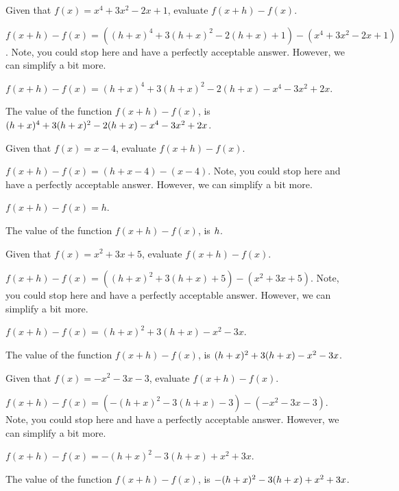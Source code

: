 \begin{shuffle}
\begin{exercise}
Given that $f(x)=x^4+3 x^2-2 x+1$, evaluate $f(x+h)-f(x)$.
\begin{solution}
\begin{hint}
$f(x+h)-f(x)=((h+x)^4+3 (h+x)^2-2 (h+x)+1)-(x^4+3 x^2-2 x+1)$. Note, you could stop here and have a perfectly acceptable answer. However, we can simplify a bit more.
\end{hint}
\begin{hint}
$f(x+h)-f(x)=(h+x)^4+3 (h+x)^2-2 (h+x)-x^4-3 x^2+2 x$.
\end{hint}
The value of the function $f(x+h)-f(x)$, is ${(h+x)^4+3 (h+x)^2-2 (h+x)-x^4-3 x^2+2 x}$.
\end{solution}
\end{exercise}

\begin{exercise}
Given that $f(x)=x-4$, evaluate $f(x+h)-f(x)$.
\begin{solution}
\begin{hint}
$f(x+h)-f(x)=(h+x-4)-(x-4)$. Note, you could stop here and have a perfectly acceptable answer. However, we can simplify a bit more.
\end{hint}
\begin{hint}
$f(x+h)-f(x)=h$.
\end{hint}
The value of the function $f(x+h)-f(x)$, is ${h}$.
\end{solution}
\end{exercise}

\begin{exercise}
Given that $f(x)=x^2+3 x+5$, evaluate $f(x+h)-f(x)$.
\begin{solution}
\begin{hint}
$f(x+h)-f(x)=((h+x)^2+3 (h+x)+5)-(x^2+3 x+5)$. Note, you could stop here and have a perfectly acceptable answer. However, we can simplify a bit more.
\end{hint}
\begin{hint}
$f(x+h)-f(x)=(h+x)^2+3 (h+x)-x^2-3 x$.
\end{hint}
The value of the function $f(x+h)-f(x)$, is ${(h+x)^2+3 (h+x)-x^2-3 x}$.
\end{solution}
\end{exercise}

\begin{exercise}
Given that $f(x)=-x^2-3 x-3$, evaluate $f(x+h)-f(x)$.
\begin{solution}
\begin{hint}
$f(x+h)-f(x)=(-(h+x)^2-3 (h+x)-3)-(-x^2-3 x-3)$. Note, you could stop here and have a perfectly acceptable answer. However, we can simplify a bit more.
\end{hint}
\begin{hint}
$f(x+h)-f(x)=-(h+x)^2-3 (h+x)+x^2+3 x$.
\end{hint}
The value of the function $f(x+h)-f(x)$, is ${-(h+x)^2-3 (h+x)+x^2+3 x}$.
\end{solution}
\end{exercise}


\end{shuffle}
